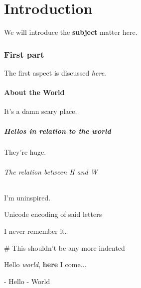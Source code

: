 \documentclass{article}
\begin{document}
\part*{Introduction}

We will introduce the \textbf{subject} matter here.

\section*{First part}

The first aspect is discussed \textit{here}.

\subsection*{About the World}

It's a damn scary place.

\subsubsection*{Hellos in relation to the world}

They're huge.

\paragraph{The relation between H and W}\mbox{}\newline

I'm uninspired.

\subparagraph{Unicode encoding of said letters}\mbox{}\newline

I never remember it.

\subparagraph{\# This shouldn't be any more indented}\mbox{}\newline

Hello \textit{world}, \textbf{here} I come...

- Hello
- World
\end{document}
